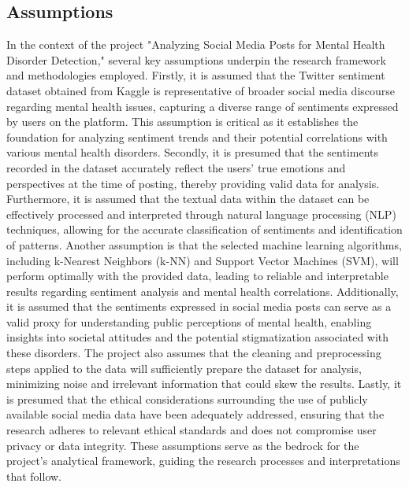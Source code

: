 \subsection{Assumptions}
\noindent
In the context of the project "Analyzing Social Media Posts for Mental Health Disorder Detection," several key assumptions underpin the research framework and methodologies employed. Firstly, it is assumed that the Twitter sentiment dataset obtained from Kaggle is representative of broader social media discourse regarding mental health issues, capturing a diverse range of sentiments expressed by users on the platform. This assumption is critical as it establishes the foundation for analyzing sentiment trends and their potential correlations with various mental health disorders. Secondly, it is presumed that the sentiments recorded in the dataset accurately reflect the users' true emotions and perspectives at the time of posting, thereby providing valid data for analysis. Furthermore, it is assumed that the textual data within the dataset can be effectively processed and interpreted through natural language processing (NLP) techniques, allowing for the accurate classification of sentiments and identification of patterns. Another assumption is that the selected machine learning algorithms, including k-Nearest Neighbors (k-NN) and Support Vector Machines (SVM), will perform optimally with the provided data, leading to reliable and interpretable results regarding sentiment analysis and mental health correlations. Additionally, it is assumed that the sentiments expressed in social media posts can serve as a valid proxy for understanding public perceptions of mental health, enabling insights into societal attitudes and the potential stigmatization associated with these disorders. The project also assumes that the cleaning and preprocessing steps applied to the data will sufficiently prepare the dataset for analysis, minimizing noise and irrelevant information that could skew the results. Lastly, it is presumed that the ethical considerations surrounding the use of publicly available social media data have been adequately addressed, ensuring that the research adheres to relevant ethical standards and does not compromise user privacy or data integrity. These assumptions serve as the bedrock for the project's analytical framework, guiding the research processes and interpretations that follow.

